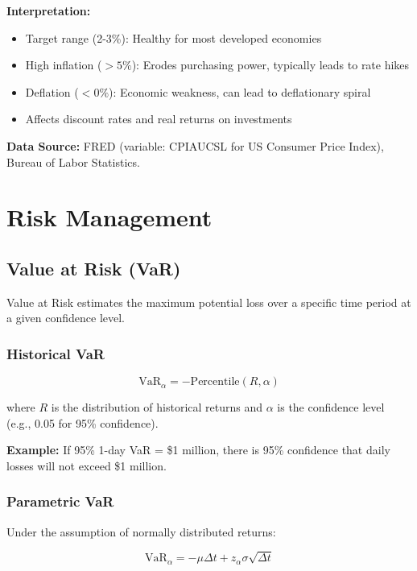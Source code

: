 \documentclass[11pt,a4paper]{article}
\begin{document}
\textbf{Interpretation:}
\begin{itemize}
    \item Target range (2-3\%): Healthy for most developed economies
    \item High inflation ($>5\%$): Erodes purchasing power, typically leads to rate hikes
    \item Deflation ($<0\%$): Economic weakness, can lead to deflationary spiral
    \item Affects discount rates and real returns on investments
\end{itemize}

\textbf{Data Source:} FRED (variable: CPIAUCSL for US Consumer Price Index), Bureau of Labor Statistics.

\section{Risk Management}

\subsection{Value at Risk (VaR)}

Value at Risk estimates the maximum potential loss over a specific time period at a given confidence level.

\subsubsection{Historical VaR}

\begin{equation}
\text{VaR}_\alpha = -\text{Percentile}(R, \alpha)
\end{equation}

where $R$ is the distribution of historical returns and $\alpha$ is the confidence level (e.g., 0.05 for 95\% confidence).

\textbf{Example:} If 95\% 1-day VaR = \$1 million, there is 95\% confidence that daily losses will not exceed \$1 million.

\subsubsection{Parametric VaR}

Under the assumption of normally distributed returns:

\begin{equation}
\text{VaR}_\alpha = -\mu \Delta t + z_\alpha \sigma \sqrt{\Delta t}
\end{equation}
\end{document}
